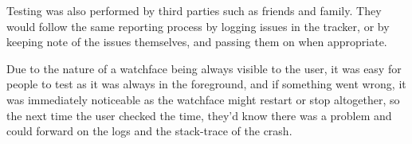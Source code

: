 Testing was also performed by third parties such as friends and family. They
would follow the same reporting process by logging issues in the tracker, or
by keeping note of the issues themselves, and passing them on when appropriate.

Due to the nature of a watchface being always visible to the user, it was easy
for people to test as it was always in the foreground, and if something went
wrong, it was immediately noticeable as the watchface might restart or stop
altogether, so the next time the user checked the time, they'd know there was
a problem and could forward on the logs and the stack-trace of the crash.
